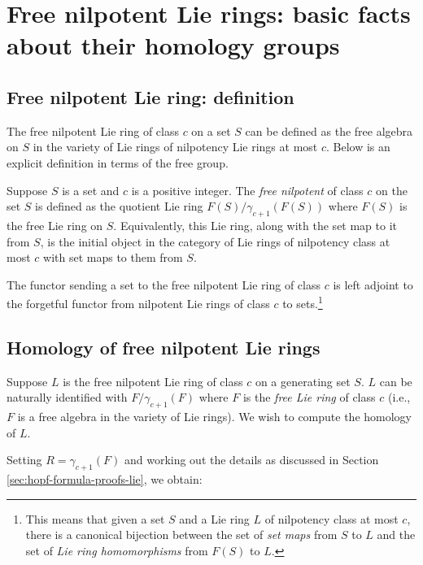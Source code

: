 
\section{Free nilpotent Lie rings: basic facts about their homology groups}\label{sec:free-nilpotent-lie-homology}

\subsection{Free nilpotent Lie ring: definition}

The free nilpotent Lie ring of class $c$ on a set $S$ can be defined
as the free algebra on $S$ in the variety of Lie rings of nilpotency
Lie rings at most $c$. Below is an explicit definition in terms of the
free group.

\begin{definer}
  Suppose $S$ is a set and $c$ is a positive integer. The {\em free
    nilpotent } of class $c$ on the set $S$ is defined as the
  quotient Lie ring $F(S)/\gamma_{c+1}(F(S))$ where $F(S)$ is the free
  Lie ring on $S$. Equivalently, this Lie ring, along with the set map to it
  from $S$, is the initial object in the category of Lie rings of
  nilpotency class at most $c$ with set maps to them from $S$.

  The functor sending a set to the free nilpotent Lie ring of class $c$
  is left adjoint to the forgetful functor from nilpotent Lie rings of
  class $c$ to sets.\footnote{This means that given a set $S$ and a
    Lie ring $L$ of nilpotency class at most $c$, there is a canonical
    bijection between the set of {\em set maps} from $S$ to $L$ and
    the set of {\em Lie ring homomorphisms} from $F(S)$ to $L$.}
\end{definer}

\subsection{Homology of free nilpotent Lie rings}

Suppose $L$ is the free nilpotent Lie ring of class $c$ on a generating
set $S$. $L$ can be naturally identified with $F/\gamma_{c+1}(F)$
where $F$ is the {\em free Lie ring} of class $c$ (i.e., $F$ is a free
algebra in the variety of Lie rings). We wish to compute the homology of
$L$.

Setting $R = \gamma_{c+1}(F)$ and working out the details as discussed
in Section \ref{sec:hopf-formula-proofs-lie}, we obtain:

